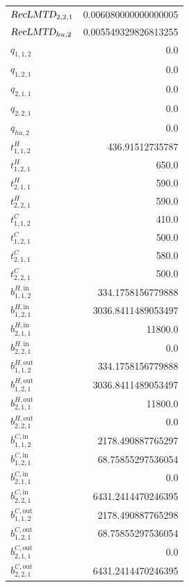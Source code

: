 \documentclass{article}%
\begin{document}
\begin{multicols*}{3}
\begin{supertabular}{lr}
	$\textsl{RecLMTD}_{2,2,1}$ & 0.006080000000000005 \\%
	$\textsl{RecLMTD}_{hu,2}$ & 0.005549329826813255 \\%
	$q_{1,1,2}$ & 0.0 \\%
	$q_{1,2,1}$ & 0.0 \\%
	$q_{2,1,1}$ & 0.0 \\%
	$q_{2,2,1}$ & 0.0 \\%
	$q_{hu,2}$ & 0.0 \\%
	$t_{1,1,2}^{H}$ & 436.91512735787 \\%
	$t_{1,2,1}^{H}$ & 650.0 \\%
	$t_{2,1,1}^{H}$ & 590.0 \\%
	$t_{2,2,1}^{H}$ & 590.0 \\%
	$t_{1,1,2}^{C}$ & 410.0 \\%
	$t_{1,2,1}^{C}$ & 500.0 \\%
	$t_{2,1,1}^{C}$ & 580.0 \\%
	$t_{2,2,1}^{C}$ & 500.0 \\%
	$b_{1,1,2}^{H,\text{in}}$ & 334.1758156779888 \\%
	$b_{1,2,1}^{H,\text{in}}$ & 3036.8411489053497 \\%
	$b_{2,1,1}^{H,\text{in}}$ & 11800.0 \\%
	$b_{2,2,1}^{H,\text{in}}$ & 0.0 \\%
	$b_{1,1,2}^{H,\text{out}}$ & 334.1758156779888 \\%
	$b_{1,2,1}^{H,\text{out}}$ & 3036.8411489053497 \\%
	$b_{2,1,1}^{H,\text{out}}$ & 11800.0 \\%
	$b_{2,2,1}^{H,\text{out}}$ & 0.0 \\%
	$b_{1,1,2}^{C,\text{in}}$ & 2178.490887765297 \\%
	$b_{1,2,1}^{C,\text{in}}$ & 68.75855297536054 \\%
	$b_{2,1,1}^{C,\text{in}}$ & 0.0 \\%
	$b_{2,2,1}^{C,\text{in}}$ & 6431.2414470246395 \\%
	$b_{1,1,2}^{C,\text{out}}$ & 2178.490887765298 \\%
	$b_{1,2,1}^{C,\text{out}}$ & 68.75855297536054 \\%
	$b_{2,1,1}^{C,\text{out}}$ & 0.0 \\%
	$b_{2,2,1}^{C,\text{out}}$ & 6431.2414470246395 \\%
\end{supertabular}%
\end{multicols*}%
\end{document}
